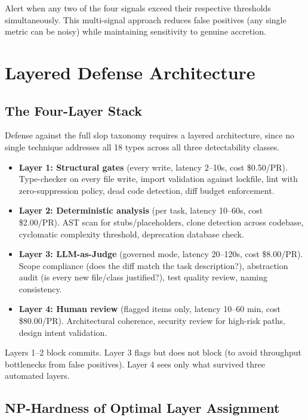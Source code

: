 \documentclass[11pt, a4paper, logo, copyright]{googledeepmind}
\begin{document}
Alert when any two of the four signals exceed their respective thresholds simultaneously. This multi-signal approach reduces false positives (any single metric can be noisy) while maintaining sensitivity to genuine accretion.


\section{Layered Defense Architecture}
\label{sec:defense}

\subsection{The Four-Layer Stack}

Defense against the full slop taxonomy requires a layered architecture, since no single technique addresses all 18 types across all three detectability classes.

\begin{itemize}[nosep]
    \item \textbf{Layer 1: Structural gates} (every write, latency 2--10s, cost \$0.50/PR). Type-checker on every file write, import validation against lockfile, lint with zero-suppression policy, dead code detection, diff budget enforcement.
    \item \textbf{Layer 2: Deterministic analysis} (per task, latency 10--60s, cost \$2.00/PR). AST scan for stubs/placeholders, clone detection across codebase, cyclomatic complexity threshold, deprecation database check.
    \item \textbf{Layer 3: LLM-as-Judge} (governed mode, latency 20--120s, cost \$8.00/PR). Scope compliance (does the diff match the task description?), abstraction audit (is every new file/class justified?), test quality review, naming consistency.
    \item \textbf{Layer 4: Human review} (flagged items only, latency 10--60 min, cost \$80.00/PR). Architectural coherence, security review for high-risk paths, design intent validation.
\end{itemize}

Layers 1--2 block commits. Layer 3 flags but does not block (to avoid throughput bottlenecks from false positives). Layer 4 sees only what survived three automated layers.

\subsection{NP-Hardness of Optimal Layer Assignment}
\end{document}
